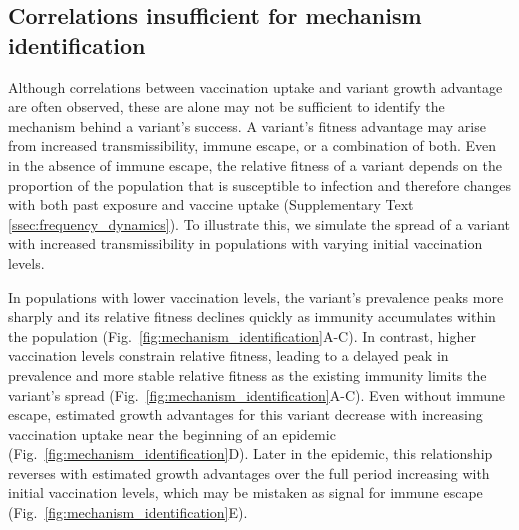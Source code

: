 \documentclass[11pt,oneside,letterpaper]{article}
\begin{document}
\subsection*{Correlations insufficient for mechanism identification}

Although correlations between vaccination uptake and variant growth advantage are often observed, these are alone may not be sufficient to identify the mechanism behind a variant's success.
A variant’s fitness advantage may arise from increased transmissibility, immune escape, or a combination of both.
Even in the absence of immune escape, the relative fitness of a variant depends on the proportion of the population that is susceptible to infection and therefore changes with both past exposure and vaccine uptake (Supplementary Text \ref{ssec:frequency_dynamics}).
To illustrate this, we simulate the spread of a variant with increased transmissibility in populations with varying initial vaccination levels.

In populations with lower vaccination levels, the variant’s prevalence peaks more sharply and its relative fitness declines quickly as immunity accumulates within the population (Fig.~\ref{fig:mechanism_identification}A-C).
In contrast, higher vaccination levels constrain relative fitness, leading to a delayed peak in prevalence and more stable relative fitness as the existing immunity limits the variant’s spread (Fig.~\ref{fig:mechanism_identification}A-C).
Even without immune escape, estimated growth advantages for this variant decrease with increasing vaccination uptake near the beginning of an epidemic (Fig.~\ref{fig:mechanism_identification}D).
Later in the epidemic, this relationship reverses with estimated growth advantages over the full period increasing with initial vaccination levels, which may be mistaken as signal for immune escape (Fig.~\ref{fig:mechanism_identification}E).

\end{document}
